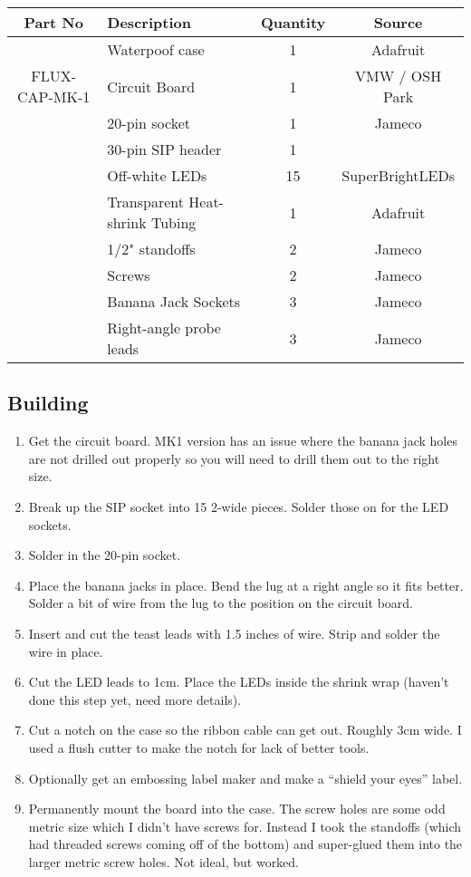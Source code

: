 \documentclass[11pt]{article}
\begin{document}
\begin{tabular}{|c|l|c|c|}
\hline
Part No	&  Description			&  Quantity	& Source \\
\hline
\hline
	& Waterpoof case		& 1		& Adafruit \\
\hline
FLUX-CAP-MK-1	& Circuit Board		& 1		& VMW / OSH Park \\
\hline
	& 20-pin socket			& 1		& Jameco \\
\hline
	& 30-pin SIP header		& 1		&	\\
\hline
	& Off-white LEDs		& 15		& SuperBrightLEDs \\
\hline
	& Transparent Heat-shrink Tubing &	1	& Adafruit \\
\hline
	& 1/2" standoffs		& 2		& Jameco\\
\hline
	& Screws			& 2		& Jameco\\
\hline
	& Banana Jack Sockets		& 3		& Jameco \\
\hline
	& Right-angle probe leads	& 3		& Jameco \\
\hline
\hline
\end{tabular}

\subsection{Building}

\begin{enumerate}

\item Get the circuit board.  MK1 version has an issue where the
	banana jack holes are not drilled out properly so you will
	need to drill them out to the right size.
\item Break up the SIP socket into 15 2-wide pieces.
	Solder those on for the LED sockets.
\item Solder in the 20-pin socket.
\item Place the banana jacks in place.  
	Bend the lug at a right angle so it fits better.
	Solder a bit of wire from the lug to the position on the
	circuit board.
\item Insert and cut the teast leads with 1.5 inches of wire.  Strip
	and solder the wire in place.
\item 	Cut the LED leads to 1cm.
	Place the LEDs inside the shrink wrap (haven't done this step
	yet, need more details).
\item Cut a notch on the case so the ribbon cable can get out.
	Roughly 3cm wide.  I used a flush cutter to make the notch
	for lack of better tools.
\item Optionally get an embossing label maker and make a 
	``shield your eyes'' label.
\item Permanently mount the board into the case.  The screw holes
	are some odd metric size which I didn't have screws for.
	Instead I took the standoffs (which had threaded screws coming
	off of the bottom) and super-glued them into the larger metric
	screw holes.  
	Not ideal, but worked.
\end{enumerate}
\end{document}
